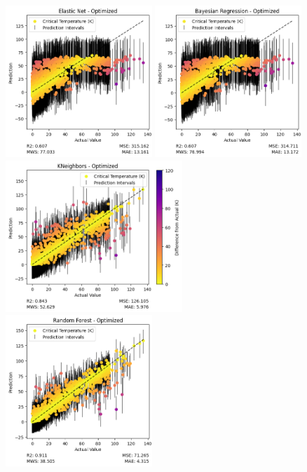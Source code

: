 \documentclass[twocolumn, nofootinbib, secnumarabic, amssymb, nobibnotes, aps, prd]{revtex4-2}
\begin{document}
\begin{figure}[!h]
    \centering
    \includegraphics[height=2.25in]{images/subfigures/uncertainty/elastic_net_optimized.png}
    \includegraphics[height=2.25in]{images/subfigures/uncertainty/bayesian_regression_optimized.png}
    \includegraphics[height=2.25in]{images/subfigures/uncertainty/kneighbors_optimized.png}
    \includegraphics[height=2.25in]{images/subfigures/uncertainty/random_forest_optimized.png}

\end{figure}
\end{document}
